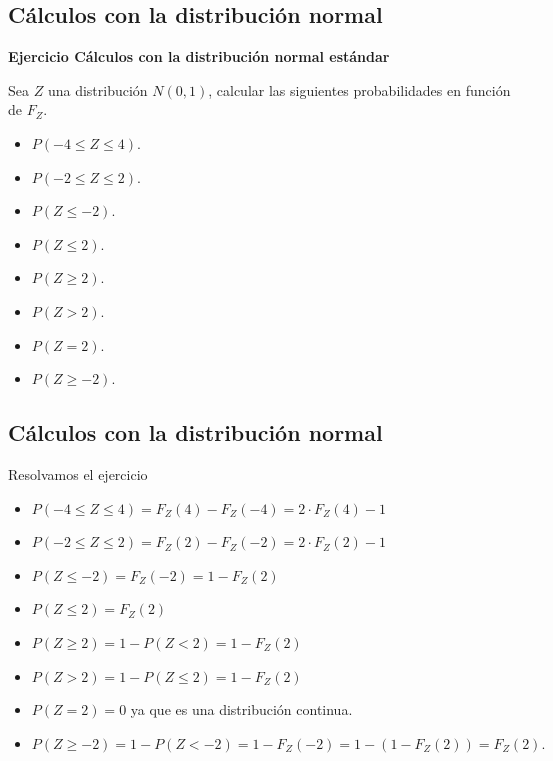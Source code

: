 \documentclass[]{book}
\providecommand{\tightlist}{%
  \setlength{\itemsep}{0pt}\setlength{\parskip}{0pt}}
\begin{document}
\hypertarget{cuxe1lculos-con-la-distribuciuxf3n-normal}{%
\subsection{Cálculos con la distribución normal}\label{cuxe1lculos-con-la-distribuciuxf3n-normal}}

\textbf{Ejercicio Cálculos con la distribución normal estándar}

Sea \(Z\) una distribución \(N(0,1)\), calcular las siguientes probabilidades en función de \(F_Z\).

\begin{itemize}
\tightlist
\item
  \(P(-4\leq Z \leq 4).\)
\item
  \(P(-2\leq Z \leq 2).\)
\item
  \(P(Z\leq -2).\)
\item
  \(P( Z \leq 2).\)
\item
  \(P( Z \geq 2).\)
\item
  \(P( Z > 2).\)
\item
  \(P( Z = 2).\)
\item
  \(P( Z \geq -2).\)
\end{itemize}

\hypertarget{cuxe1lculos-con-la-distribuciuxf3n-normal-1}{%
\subsection{Cálculos con la distribución normal}\label{cuxe1lculos-con-la-distribuciuxf3n-normal-1}}

Resolvamos el ejercicio

\begin{itemize}
\tightlist
\item
  \(P(-4\leq Z \leq 4)=F_{Z}(4)-F_{Z}(-4)=2\cdot F_Z(4)-1\)
\item
  \(P(-2\leq Z \leq 2)=F_{Z}(2)-F_{Z}(-2)=2\cdot F_Z(2)-1\)
\item
  \(P(Z\leq -2)=F_Z(-2)=1-F_Z(2)\)
\item
  \(P( Z \leq 2)=F_{Z}(2)\)
\item
  \(P( Z \geq 2)=1-P(Z<2)=1-F_{Z}(2)\)
\item
  \(P( Z > 2)=1-P(Z\leq 2)=1-F_{Z}(2)\)
\item
  \(P( Z = 2)=0\) ya que es una distribución continua.
\item
  \(P( Z \geq -2)=1-P(Z< -2)=1-F_{Z}(-2)=1-(1-F_Z(2))=F_Z(2).\)
\end{itemize}
\end{document}
